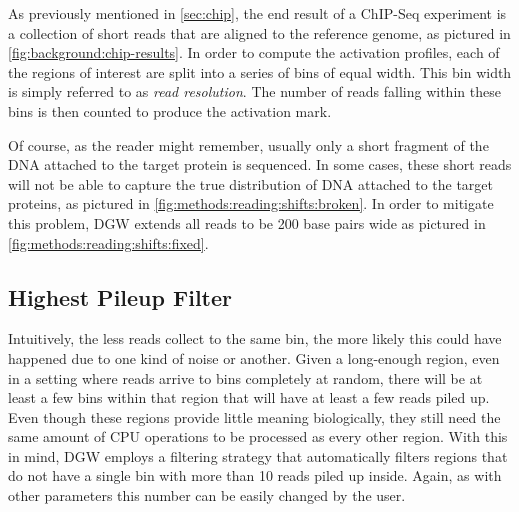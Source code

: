 \documentclass[parskip]{cs4rep}
\begin{document}
As previously mentioned in \autoref{sec:chip}, the end result of a ChIP-Seq experiment is a collection of short reads that are aligned to the reference genome, as pictured in \autoref{fig:background:chip-results}. In order to compute the activation profiles, each of the regions of interest are split into a series of bins of equal width. This bin width is simply referred to as \emph{read resolution}. The number of reads falling within these bins is then counted to produce the activation mark.

Of course, as the reader might remember, usually only a short fragment of the DNA attached to the target protein is sequenced. In some cases, these short reads will not be able to capture the true distribution of DNA attached to the target proteins, as pictured in \autoref{fig:methods:reading:shifts:broken}. In order to mitigate this problem, DGW extends all reads to be 200 base pairs wide as pictured in \autoref{fig:methods:reading:shifts:fixed}.

\subsection{Highest Pileup Filter}
Intuitively, the less reads collect to the same bin, the more likely this could have happened due to one kind of noise or another. Given a long-enough region, even in a setting where reads arrive to bins completely at random, there will be at least a few bins within that region that will have at least a few reads piled up. Even though these regions provide little meaning biologically, they still need the same amount of CPU operations to be processed as every other region. With this in mind, DGW employs a filtering strategy that automatically filters regions that do not have a single bin with more than 10 reads piled up inside. Again, as with other parameters this number can be easily changed by the user.
\end{document}
